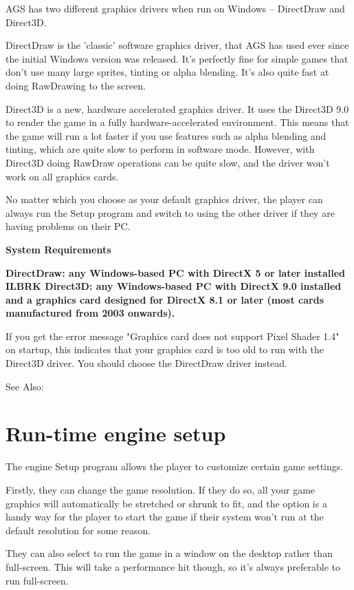AGS has two different graphics drivers when run on Windows -- DirectDraw and Direct3D.

DirectDraw is the 'classic' software graphics driver, that AGS has used ever since
the initial Windows version was released. It's perfectly fine for simple games
that don't use many large sprites, tinting or alpha blending. It's also quite fast
at doing RawDrawing to the screen.

Direct3D is a new, hardware accelerated graphics driver. It uses the Direct3D 9.0 to
render the game in a fully hardware-accelerated environment. This means that the
game will run a lot faster if you use features such as alpha blending and tinting,
which are quite slow to perform in software mode. However, with Direct3D doing RawDraw
operations can be quite slow, and the driver won't work on all graphics cards.

No matter which you choose as your default graphics driver, the player can always
run the Setup program and switch to using the other driver if they are having problems
on their PC.

\bf{System Requirements}

\bf{DirectDraw}: any Windows-based PC with DirectX 5 or later installed ILBRK
\bf{Direct3D}: any Windows-based PC with DirectX 9.0 installed and a graphics card designed
for DirectX 8.1 or later (most cards manufactured from 2003 onwards).

If you get the error message "Graphics card does not support Pixel Shader 1.4" on startup,
this indicates that your graphics card is too old to run with the Direct3D driver. You
should choose the DirectDraw driver instead.

See Also: 


\section{Run-time engine setup}%

The engine Setup program allows the player to customize certain game settings.

Firstly, they can change the game resolution. If they do so, all your game
graphics will automatically be stretched or shrunk to fit, and the option is a
handy way for the player to start the game if their system won't run at the default
resolution for some reason.

They can also select to run the game in a window on the desktop rather than full-screen.
This will take a performance hit though, so it's always preferable to run full-screen.


